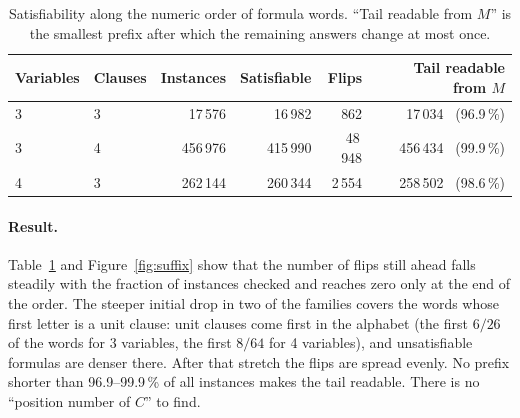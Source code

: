 \documentclass[11pt,a4paper]{article}
\begin{document}
\begin{table}[h]
\centering
\caption{Satisfiability along the numeric order of formula words. ``Tail readable from $M$'' is the smallest prefix after which the remaining answers change at most once.}
\label{tab:weightorder}
\begin{tabular}{@{}llrrrr@{}}
\toprule
Variables & Clauses & Instances & Satisfiable & Flips & Tail readable from $M$ \\
\midrule
3 & 3 & 17\,576 & 16\,982 & 862 & 17\,034 \ (96.9\,\%)\\
3 & 4 & 456\,976 & 415\,990 & 48\,948 & 456\,434 \ (99.9\,\%)\\
4 & 3 & 262\,144 & 260\,344 & 2\,554 & 258\,502 \ (98.6\,\%)\\
\bottomrule
\end{tabular}
\end{table}

\paragraph{Result.} Table~\ref{tab:weightorder} and Figure~\ref{fig:suffix} show that the number of flips still ahead falls steadily with the fraction of instances checked and reaches zero only at the end of the order. The steeper initial drop in two of the families covers the words whose first letter is a unit clause: unit clauses come first in the alphabet (the first $6/26$ of the words for 3 variables, the first $8/64$ for 4 variables), and unsatisfiable formulas are denser there. After that stretch the flips are spread evenly. No prefix shorter than 96.9--99.9\,\% of all instances makes the tail readable. There is no ``position number of $C$'' to find.
\end{document}
